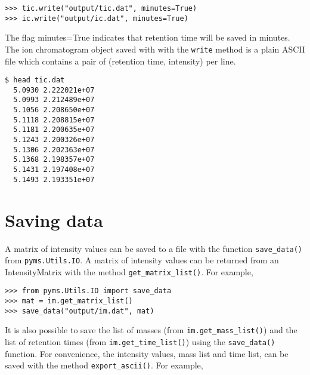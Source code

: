\begin{verbatim}
>>> tic.write("output/tic.dat", minutes=True)
>>> ic.write("output/ic.dat", minutes=True)
\end{verbatim}

\noindent
The flag minutes=True indicates that retention time will be saved in minutes.
The ion chromatogram object saved with with the {\tt write{}} method is a
plain ASCII file which contains a pair of (retention time, intensity) per
line.

\begin{verbatim}
$ head tic.dat
  5.0930 2.222021e+07
  5.0993 2.212489e+07
  5.1056 2.208650e+07
  5.1118 2.208815e+07
  5.1181 2.200635e+07
  5.1243 2.200326e+07
  5.1306 2.202363e+07
  5.1368 2.198357e+07
  5.1431 2.197408e+07
  5.1493 2.193351e+07
\end{verbatim}

%

\section{Saving data}


\noindent
A matrix of intensity values can be saved to a file with the function
{\tt save\_data()} from {\tt pyms.Utils.IO}. A matrix of intensity values can
be returned from an IntensityMatrix with the method {\tt get\_matrix\_list()}.
For example,

\begin{verbatim}
>>> from pyms.Utils.IO import save_data
>>> mat = im.get_matrix_list()
>>> save_data("output/im.dat", mat)
\end{verbatim}

It is also possible to save the list of masses (from {\tt im.get\_mass\_list()})
and the list of retention times (from {\tt im.get\_time\_list()}) using the
{\tt save\_data()} function. For convenience, the intensity values, mass list
 and time list, can be saved with the method {\tt export\_ascii()}. For example,

